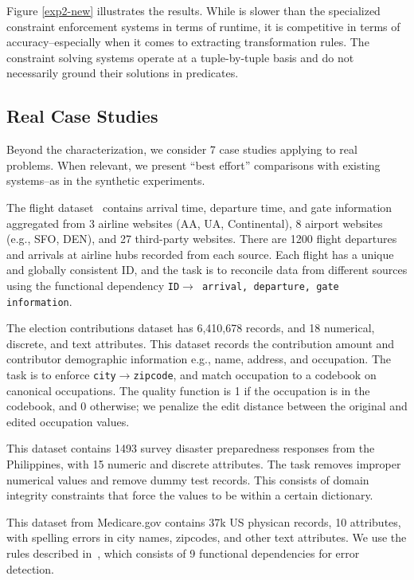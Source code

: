 Figure \ref{exp2-new} illustrates the results. While \sys is slower than the specialized constraint enforcement systems in terms of runtime, it is competitive in terms of accuracy--especially when it comes to extracting transformation rules. The constraint solving systems operate at a tuple-by-tuple basis and do not necessarily ground their solutions in predicates.

\subsection{Real Case Studies}
Beyond the characterization, we consider 7 case studies applying \sys to real problems. When relevant, we present ``best effort'' comparisons with existing systems--as in the synthetic experiments.

 The flight dataset~\cite{data-flights} contains arrival time, departure time, and gate information aggregated from 3 airline websites (AA, UA, Continental), 8 airport websites (e.g., SFO, DEN), and 27 third-party websites.
There are 1200 flight departures and arrivals at airline hubs recorded from each source.  Each flight has a unique and globally consistent ID, and the task is to reconcile data from different sources using the functional dependency \texttt{ID$\rightarrow$ arrival, departure, gate information}.

 The election contributions dataset has 6,410,678 records, and 18 numerical, discrete, and text attributes. This dataset records the contribution amount and contributor demographic information e.g., name, address, and occupation.  The task is to enforce \texttt{city$\rightarrow$zipcode}, and match occupation to a codebook on canonical occupations.  The quality function is 1 if the occupation is in the codebook, and 0 otherwise; we penalize the edit distance between the original and edited occupation values.

 This dataset contains 1493 survey disaster preparedness responses from the Philippines, with 15 numeric and discrete attributes. The task removes improper numerical values and remove dummy test records. This consists of domain integrity constraints that force the values to be within a certain dictionary.

 This dataset from Medicare.gov contains 37k US physican records, 10 attributes, with spelling errors in city names, zipcodes, and other text attributes. We use the rules described in~\cite{rekatsinas2017holoclean}, which consists of 9 functional dependencies for error detection. 

